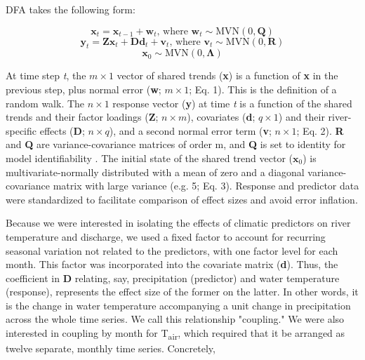\documentclass[notitlepage]{article}
\begin{document}
DFA takes the following form:

\begin{equation}
    \textbf{x}_t = \textbf{x}_{t-1} + \textbf{w}_t\textrm{, where } \textbf{w}_t \sim \textrm{MVN}(0,\textbf{Q})
\end{equation}
\begin{equation}
    \textbf{y}_t = \textbf{Zx}_t + \textbf{Dd}_t + \textbf{v}_t\textrm{, where } \textbf{v}_t \sim \textrm{MVN}(0,\textbf{R})
\end{equation}
\begin{equation}
    \textbf{x}_0 \sim \textrm{MVN}(0,\bm{\Lambda})
\end{equation}

At time step {\it t}, the $m \times 1$ vector of shared trends (\textbf{x}) is a function of \textbf{x} in the previous step, plus normal error (\textbf{w}; $m\times 1$; Eq. 1). This is the definition of a random walk. The $n\times 1$ response vector (\textbf{y}) at time {\it t} is a function of the shared trends and their factor loadings (\textbf{Z}; $n\times m$), covariates (\textbf{d}; $q\times 1$) and their river-specific effects (\textbf{D}; $n\times q$), and a second normal error term (\textbf{v}; $n\times 1$; Eq. 2). \textbf{R} and \textbf{Q} are variance-covariance matrices of order m, and \textbf{Q} is set to identity for model identifiability \citep{harvey1990forecasting}. The initial state of the shared trend vector ($\bm{x}_0$) is multivariate-normally distributed with a mean of zero and a diagonal variance-covariance matrix with large variance (e.g. 5; Eq. 3). Response and predictor data were standardized to facilitate comparison of effect sizes and avoid error inflation.


Because we were interested in isolating the effects of climatic predictors on river temperature and discharge, we used a fixed factor to account for recurring seasonal variation not related to the predictors, with one factor level for each month. This factor was incorporated into the covariate matrix (\textbf{d}). Thus, the coefficient in \textbf{D} relating, say, precipitation (predictor) and water temperature (response), represents the effect size of the former on the latter. In other words, it is the change in water temperature accompanying a unit change in precipitation across the whole time series. We call this relationship "coupling." We were also interested in coupling by month for T\textsubscript{air}, which required that it be arranged as twelve separate, monthly time series. Concretely,
\end{document}
